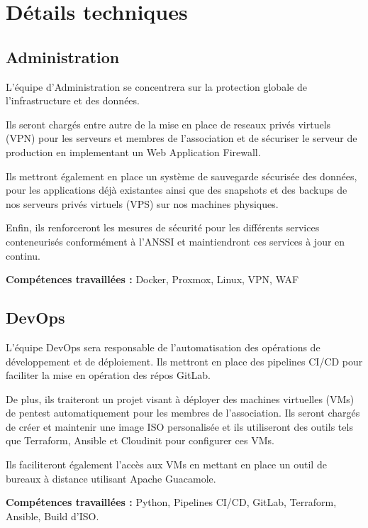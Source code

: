 \documentclass[12pt]{article}
\begin{document}
	\section{Détails techniques}
	
	\subsection{Administration}
	L'équipe d'Administration se concentrera sur la protection globale de l'infrastructure et des données. 
	\bigskip
	
	\noindent Ils seront chargés entre autre de la mise en place de reseaux privés virtuels (VPN) pour les serveurs et membres de l'association et de sécuriser le serveur de production en implementant un Web Application Firewall. 
	\bigskip
	
	\noindent Ils mettront également en place un système de sauvegarde sécurisée des données, pour les applications déjà existantes ainsi que des snapshots et des backups de nos serveurs privés virtuels (VPS) sur nos machines physiques. 
	\bigskip
	
	\noindent Enfin, ils renforceront les mesures de sécurité pour les différents services conteneurisés conformément  à l'ANSSI et maintiendront ces services à jour en continu.
	
	\bigskip
	
	\noindent \textbf{Compétences travaillées :} Docker, Proxmox, Linux, VPN, WAF
	
	\subsection{DevOps}
	L'équipe DevOps sera responsable de l'automatisation des opérations de développement et de déploiement. Ils mettront en place des pipelines CI/CD pour faciliter la mise en opération des répos GitLab. 
	\bigskip
	
	\noindent De plus, ils traiteront un projet visant à déployer des machines virtuelles (VMs) de pentest automatiquement pour les membres de l'association. Ils seront chargés de créer et maintenir une image ISO personalisée et ils utiliseront des outils tels que Terraform, Ansible et Cloudinit pour configurer ces VMs. 
	\bigskip
	
	\noindent Ils faciliteront également l'accès aux VMs en mettant en place un outil de bureaux à distance utilisant Apache Guacamole.
	
	\bigskip
	
	\noindent \textbf{Compétences travaillées :}  Python, Pipelines CI/CD, GitLab, Terraform, Ansible, Build d'ISO.
	
\end{document}
